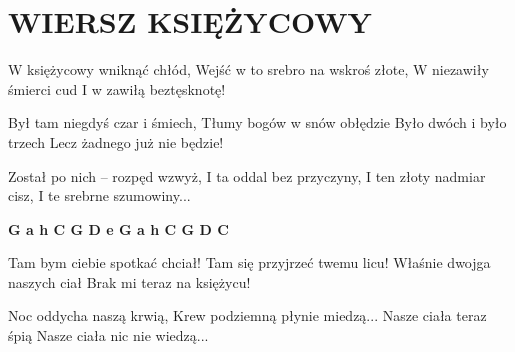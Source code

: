 \documentclass[../../../songbook.tex]{subfiles}
\begin{document}
\TabPositions{8cm} %
\section*{WIERSZ KSIĘŻYCOWY}
{}
\vspace{0.5cm}
W księżycowy wniknąć chłód, 		 \newline 
Wejść w to srebro na wskroś złote, 	 \newline 
W niezawiły śmierci cud 			 \newline 
I w zawiłą beztęsknotę! 			 \newline 

Był tam niegdyś czar i śmiech,	\newline 
Tłumy bogów w snów obłędzie		\newline 
Było dwóch i było trzech		\newline 
Lecz żadnego już nie będzie!	\newline 

Został po nich – rozpęd wzwyż,	 \newline 
I ta oddal bez przyczyny,		 \newline 
I ten złoty nadmiar cisz,		 \newline 
I te srebrne szumowiny...		 \newline 

{\color{red}\textbf{G a h C G D e G a h C G D C} } \newline

Tam bym ciebie spotkać chciał!		\newline 
Tam się przyjrzeć twemu licu!		\newline 
Właśnie dwojga naszych ciał		\newline 
Brak mi teraz na księżycu!		\newline 

Noc oddycha naszą krwią,		\newline 
Krew podziemną płynie miedzą...	\newline 
Nasze ciała teraz śpią 			\newline 
Nasze ciała nic nie wiedzą...	\newline 
\end{document}
